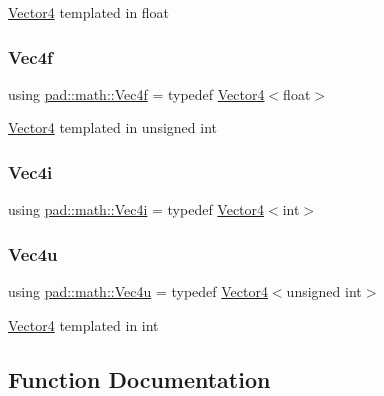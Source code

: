\mbox{\hyperlink{structpad_1_1math_1_1_vector4}{Vector4}} templated in float \mbox{\label{namespacepad_1_1math_a4eb77014ac7b74bd24cf73bca82ac3a3}} 
\subsubsection{\texorpdfstring{Vec4f}{Vec4f}}
{\footnotesize\ttfamily using \mbox{\hyperlink{namespacepad_1_1math_a4eb77014ac7b74bd24cf73bca82ac3a3}{pad\+::math\+::\+Vec4f}} = typedef \mbox{\hyperlink{structpad_1_1math_1_1_vector4}{Vector4}}$<$float$>$}

\mbox{\hyperlink{structpad_1_1math_1_1_vector4}{Vector4}} templated in unsigned int \mbox{\label{namespacepad_1_1math_a6b61fad19375a5164da9e1a86403f208}} 
\subsubsection{\texorpdfstring{Vec4i}{Vec4i}}
{\footnotesize\ttfamily using \mbox{\hyperlink{namespacepad_1_1math_a6b61fad19375a5164da9e1a86403f208}{pad\+::math\+::\+Vec4i}} = typedef \mbox{\hyperlink{structpad_1_1math_1_1_vector4}{Vector4}}$<$int$>$}

\mbox{\label{namespacepad_1_1math_ad5b8d7d51edf8173f6a0ddbbb792c803}} 
\subsubsection{\texorpdfstring{Vec4u}{Vec4u}}
{\footnotesize\ttfamily using \mbox{\hyperlink{namespacepad_1_1math_ad5b8d7d51edf8173f6a0ddbbb792c803}{pad\+::math\+::\+Vec4u}} = typedef \mbox{\hyperlink{structpad_1_1math_1_1_vector4}{Vector4}}$<$unsigned int$>$}

\mbox{\hyperlink{structpad_1_1math_1_1_vector4}{Vector4}} templated in int 

\subsection{Function Documentation}
\mbox{\label{namespacepad_1_1math_aef2c4cef650688967cb74c75c5d4aafa}} 
